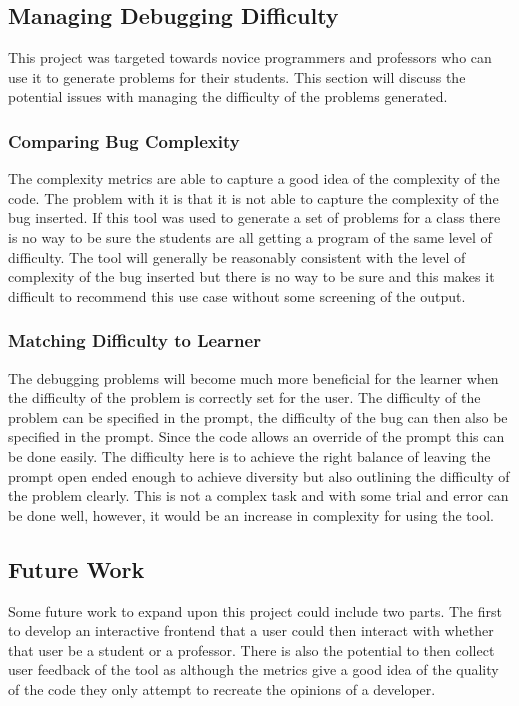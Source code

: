 \documentclass[12pt]{extarticle}
\begin{document}
\subsection{Managing Debugging Difficulty}

This project was targeted towards novice programmers and professors who can use it to generate problems for their students. This section will discuss the potential issues with managing the difficulty of the problems generated.

\subsubsection{Comparing Bug Complexity}

The complexity metrics are able to capture a good idea of the complexity of the code. The problem with it is that it is not able to capture the complexity of the bug inserted. If this tool was used to generate a set of problems for a class there is no way to be sure the students are all getting a program of the same level of difficulty. The tool will generally be reasonably consistent with the level of complexity of the bug inserted but there is no way to be sure and this makes it difficult to recommend this use case without some screening of the output.

\subsubsection{Matching Difficulty to Learner}

The debugging problems will become much more beneficial for the learner when the difficulty of the problem is correctly set for the user. The difficulty of the problem can be specified in the prompt, the difficulty of the bug can then also be specified in the prompt. Since the code allows an override of the prompt this can be done easily. The difficulty here is to achieve the right balance of leaving the prompt open ended enough to achieve diversity but also outlining the difficulty of the problem clearly. This is not a complex task and with some trial and error can be done well, however, it would be an increase in complexity for using the tool.

\subsection{Future Work}

Some future work to expand upon this project could include two parts. The first to develop an interactive frontend that a user could then interact with whether that user be a student or a professor. There is also the potential to then collect user feedback of the tool as although the metrics give a good idea of the quality of the code they only attempt to recreate the opinions of a developer.
\end{document}
